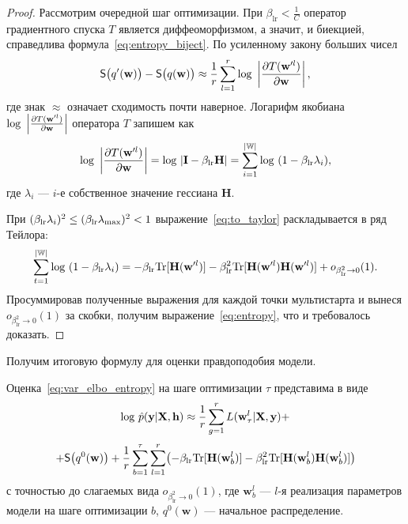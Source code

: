 \begin{proof}




Рассмотрим очередной шаг оптимизации. При $\beta_{\text{lr}}<\frac{1}{C}$ оператор градиентного спуска $T$ является диффеоморфизмом, а значит, и биекцией, справедлива формула~\eqref{eq:entropy_biject}.
По усиленному закону больших чисел 
\[
	\mathsf{S}\bigl(q'(\mathbf{w})\bigr) -  \mathsf{S}\bigl(q(\mathbf{w})\bigr)  \approx  \frac{1}{r}\sum_{l=1}^r \textnormal{log}~\left|\frac{\partial{T(\mathbf{w}'^l)}}{\partial{\mathbf{w}}}\right|,
\]
где знак $\approx$ означает сходимость почти наверное.
Логарифм якобиана  $\textnormal{log}~\left|\frac{\partial{T(\mathbf{w}'^l)}}{\partial{\mathbf{w}}}\right|$ оператора $T$ запишем как%
\begin{equation}
\label{eq:to_taylor}
	\textnormal{log}~\left|\frac{\partial{T(\mathbf{w}'^l)}}{\partial{\mathbf{w}}}\right| = \textnormal{log}~|\mathbf{I} - \beta_{\text{lr}}\mathbf{H}| = \sum_{i=1}^{|\mathbb{W}|} \textnormal{log}~(1-\beta_{\text{lr}}\lambda_i),
\end{equation}
где $\lambda_i$ --- $i$-е собственное значение гессиана $\mathbf{H}$.

При $(\beta_{\text{lr}}\lambda_i) ^ 2 \leq (\beta_{\text{lr}}\lambda_\textnormal{max})^2 < 1$ выражение~\eqref{eq:to_taylor} раскладывается в ряд Тейлора:
\[
	 \sum_{t=1}^{|\mathbb{W}|} \textnormal{log}~(1-\beta_{\text{lr}}\lambda_i) =  -\beta_{\text{lr}} \textnormal{Tr}[\mathbf{H}(\mathbf{w}'^l)] - \beta_{\text{lr}}^2 \textnormal{Tr}[\mathbf{H}(\mathbf{w}'^l)\mathbf{H}(\mathbf{w}'^l)] + o_{\beta_{\text{lr}}^2 \to 0}(1).
\]
Просуммировав полученные выражения для каждой точки мультистарта и вынеся $o_{\beta_{\text{lr}}^2 \to 0}(1)$ за скобки, получим выражение~\eqref{eq:entropy}, что и требовалось доказать.

\end{proof} 	


Получим итоговую формулу для оценки правдоподобия модели.
\begin{theorem}\label{st:st2}
Оценка~\eqref{eq:var_elbo_entropy} на шаге оптимизации $\tau$ представима в виде
\begin{equation}
\label{eq:ev_grad_full}
\textnormal{log}~\hat{p}(\mathbf{y}|\mathbf{X}, \mathbf{h}) \approx \frac{1}{r} \sum_{g = 1}^r L(\mathbf{w}^l_\tau| \mathbf{X}, \mathbf{y})  + 
\end{equation}
\[
+\mathsf{S}\big(q^0(\mathbf{w})\bigr) + \frac{1}{r}\sum_{b=1}^\tau\sum_{l=1}^r \bigl(-\beta_{\text{lr}} \textnormal{Tr}[\mathbf{H}(\mathbf{w}_b^l)] - \beta_{\text{lr}}^2 \textnormal{Tr}[\mathbf{H}(\mathbf{w}_b^l)\mathbf{H}(\mathbf{w}_b^l)]  \bigr) 
\]
с точностью до слагаемых вида $o_{\beta_{\text{lr}}^2 \to 0}(1)$,
где $\mathbf{w}_b^l$ --- $l$-я реализация параметров модели на шаге оптимизации $b$, $q^0(\mathbf{w})$ --- начальное распределение.
\end{theorem}



